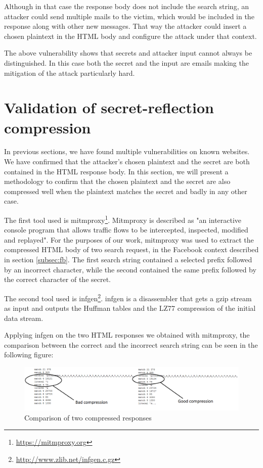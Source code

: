 Although in that case the response body does not include the search string, an
attacker could send multiple mails to the victim, which would be included in the
response along with other new messages. That way the attacker could insert a
chosen plaintext in the HTML body and configure the attack under that context.

The above vulnerability shows that secrets and attacker input cannot always be
distinguished. In this case both the secret and the input are emails
making the mitigation of the attack particularly hard.

\section{Validation of secret-reflection compression}\label{sec:mitmproxy}

In previous sections, we have found multiple vulnerabilities on known websites.
We have confirmed that the attacker's chosen plaintext and the secret are both
contained in the HTML response body. In this section, we will present a
methodology to confirm that the chosen plaintext and the secret are also
compressed well when the plaintext matches the secret and badly in any other
case.

The first tool used is mitmproxy\footnote{\url{https://mitmproxy.org}}.
Mitmproxy is described as "an interactive console program that allows traffic
flows to be intercepted, inspected, modified and replayed". For the purposes of
our work, mitmproxy was used to extract the compressed HTML body of two search
request, in the Facebook context described in section \ref{subsec:fb}. The first
search string contained a selected prefix followed by an incorrect character,
while the second contained the same prefix followed by the correct character of
the secret.

The second tool used is infgen\footnote{\url{http://www.zlib.net/infgen.c.gz}}.
infgen is a disassembler that gets a gzip stream as input and outputs the
Huffman tables and the LZ77 compression of the initial data stream.

Applying infgen on the two HTML responses we obtained with mitmproxy, the
comparison between the correct and the incorrect search string can be seen in
the following figure:

\begin{figure}[h] \caption{Comparison of two compressed responses}
\includegraphics[width=1.15\textwidth]{diagrams/compression_comparison.png}\end{figure}

